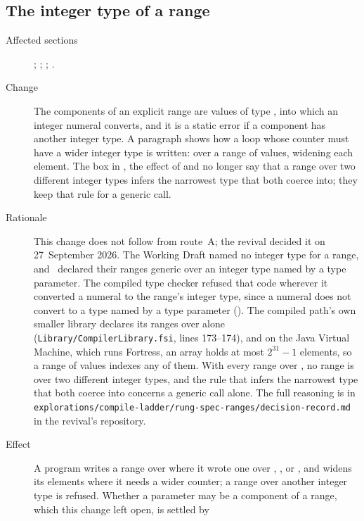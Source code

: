 \subsection{The integer type of a range}

\begin{description}
\item[Affected sections] ; ;
; .
\item[Change] The components of an explicit range are values of type
, into which an integer numeral converts, and it is a static
error if a component has another integer type. A paragraph shows how a loop
whose counter must have a wider integer type is written: over a range of
 values, widening each element.
The box in , the effect of  and
 no longer say that a range over two different
integer types infers the narrowest type that both coerce into; they keep that
rule for a generic call.
\item[Rationale] This change does not follow from route~A; the revival decided
it on 27~September 2026.
The Working Draft named no integer type for a range, and \library\ declared
their ranges generic over an integer type named by a type parameter. The
compiled type checker refused that code wherever it converted a numeral to the
range's integer type, since a numeral does not convert to a type named by a
type parameter ().
The compiled path's own smaller library declares its ranges over
 alone (\nolinkurl{Library/CompilerLibrary.fsi}, lines
173--174), and on the Java Virtual Machine, which runs Fortress, an array holds
at most $2^{31}-1$ elements, so a range of  values indexes any
of them.
With every range over , no range is over two different
integer types, and the rule that infers the narrowest type that both coerce
into concerns a generic call alone.
The full reasoning is in
\nolinkurl{explorations/compile-ladder/rung-spec-ranges/decision-record.md}
in the revival's repository.
\item[Effect] A program writes a range over  where it wrote
one over , ,  or
, and widens its elements where it needs a wider counter; a
range over another integer type is refused. Whether a  parameter may
be a component of a range, which this change left open, is settled by

\end{description}
